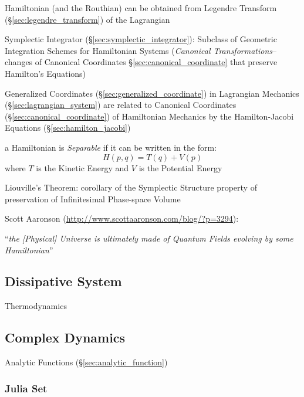 Hamiltonian (and the Routhian) can be obtained from Legendre Transform
(\S\ref{sec:legendre_transform}) of the Lagrangian

\fist Symplectic Integrator (\S\ref{sec:symplectic_integrator}): Subclass of
Geometric Integration Schemes for Hamiltonian Systems (\emph{Canonical
  Transformations}-- changes of Canonical Coordinates
\S\ref{sec:canonical_coordinate} that preserve Hamilton's Equations)

Generalized Coordinates (\S\ref{sec:generalized_coordinate}) in Lagrangian
Mechanics (\S\ref{sec:lagrangian_system}) are related to Canonical Coordinates
(\S\ref{sec:canonical_coordinate}) of Hamiltonian Mechanics by the
Hamilton-Jacobi Equations (\S\ref{sec:hamilton_jacobi})

a Hamiltonian is \emph{Separable} if it can be written in the form:
\[
  H(p,q) = T(q) + V(p)
\]
where $T$ is the Kinetic Energy and $V$ is the Potential Energy

Liouville's Theorem: corollary of the Symplectic Structure property of
preservation of Infinitesimal Phase-space Volume

Scott Aaronson (\url{http://www.scottaaronson.com/blog/?p=3294}):

``\emph{the [Physical] Universe is ultimately made of Quantum Fields
  evolving by some Hamiltonian}''



\subsection{Dissipative System}\label{sec:dissipative_system}

Thermodynamics



\subsection{Complex Dynamics}\label{sec:complex_dynamics}

Analytic Functions (\S\ref{sec:analytic_function})



\subsubsection{Julia Set}\label{sec:julia_set}

